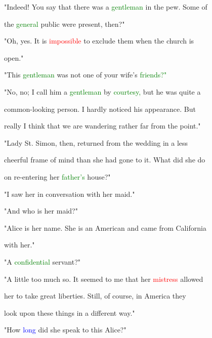  "Indeed! You say that there was a \textcolor{green}{gentleman} in the pew. Some of

 the \textcolor{green}{general} \textcolor{BurntOrange}{public} were \textcolor{BurntOrange}{present,} then?"



 "Oh, yes. It is \textcolor{red}{impossible} to exclude them when the \textcolor{BurntOrange}{church} is

 open."



 "This \textcolor{green}{gentleman} was not one of your wife's \textcolor{green}{friends?"}



 "No, no; I call him a \textcolor{green}{gentleman} by \textcolor{green}{courtesy,} but he was quite a

 common-looking person. I hardly noticed his appearance. But

 really I think that we are wandering rather far from the point."



 "Lady St. Simon, then, returned from the wedding in a less

 \textcolor{BurntOrange}{cheerful} frame of mind than she had gone to it. What did she do

 on re-entering her \textcolor{green}{father's} house?"



 "I saw her in conversation with her maid."



 "And who is her maid?"



 "Alice is her name. She is an American and came from California

 with her."



 "A \textcolor{green}{confidential} \textcolor{BurntOrange}{servant?"}



 "A little too much so. It seemed to me that her \textcolor{red}{mistress} allowed

 her to take great \textcolor{BurntOrange}{liberties.} Still, of course, in America they

 look upon these things in a different way."



 "How \textcolor{blue}{long} did she speak to this Alice?"



